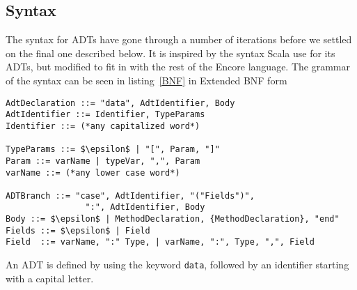 \documentclass[10pt]{report}
\def\code#1{\texttt{#1}} %
\begin{document}
\subsection{Syntax}
\par{The syntax for ADTs have gone through a number of iterations before we settled on the final one described below.  It is inspired by the syntax Scala use for its ADTs, but modified to fit in with the rest of the Encore language. The grammar of the syntax can be seen in listing~\ref{BNF} in Extended BNF form\cite{eBNF}}%

\begin{lstlisting}[language=Encore,caption={Grammar for the suggested syntax},label=BNF,mathescape=true]
AdtDeclaration ::= "data", AdtIdentifier, Body
AdtIdentifier ::= Identifier, TypeParams
Identifier ::= (*any capitalized word*)

TypeParams ::= $\epsilon$ | "[", Param, "]"
Param ::= varName | typeVar, ",", Param
varName ::= (*any lower case word*)

ADTBranch ::= "case", AdtIdentifier, "("Fields")",
                ":", AdtIdentifier, Body
Body ::= $\epsilon$ | MethodDeclaration, {MethodDeclaration}, "end"
Fields ::= $\epsilon$ | Field
Field  ::= varName, ":" Type, | varName, ":", Type, ",", Field
\end{lstlisting}

\par{An ADT is defined by using the keyword \code{data}, followed by an identifier starting with a capital letter.}
\end{document}
